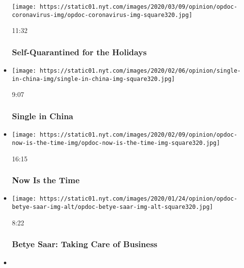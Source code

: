 \begin{itemize}
  \texttt{[image: https://static01.nyt.com/images/2020/03/09/opinion/opdoc-coronavirus-img/opdoc-coronavirus-img-square320.jpg]}

  11:32

  \hypertarget{self-quarantined-for-the-holidays}{%
  \subsubsection{Self-Quarantined for the
  Holidays}\label{self-quarantined-for-the-holidays}}
\item
  \href{https://www.nytimes.com/video/opinion/100000006948977/single-in-china.html?action=click\&module=video-series-bar\&region=header\&pgtype=Article\&playlistId=video/op-docs}{}

  \texttt{[image: https://static01.nyt.com/images/2020/02/06/opinion/single-in-china-img/single-in-china-img-square320.jpg]}

  9:07

  \hypertarget{single-in-china}{%
  \subsubsection{Single in China}\label{single-in-china}}
\item
  \href{https://www.nytimes.com/video/opinion/100000006946174/now-is-the-time.html?action=click\&module=video-series-bar\&region=header\&pgtype=Article\&playlistId=video/op-docs}{}

  \texttt{[image: https://static01.nyt.com/images/2020/02/09/opinion/opdoc-now-is-the-time-img/opdoc-now-is-the-time-img-square320.jpg]}

  16:15

  \hypertarget{now-is-the-time}{%
  \subsubsection{Now Is the Time}\label{now-is-the-time}}
\item
  \href{https://www.nytimes.com/video/opinion/100000006923399/betye-saar-taking-care-of-business.html?action=click\&module=video-series-bar\&region=header\&pgtype=Article\&playlistId=video/op-docs}{}

  \texttt{[image: https://static01.nyt.com/images/2020/01/24/opinion/opdoc-betye-saar-img-alt/opdoc-betye-saar-img-alt-square320.jpg]}

  8:22

  \hypertarget{betye-saar-taking-care-of-business}{%
  \subsubsection{Betye Saar: Taking Care of
  Business}\label{betye-saar-taking-care-of-business}}
\item
  \href{https://www.nytimes.com/video/opinion/100000006831435/music-and-clowns.html?action=click\&module=video-series-bar\&region=header\&pgtype=Article\&playlistId=video/op-docs}{}


\end{itemize}
